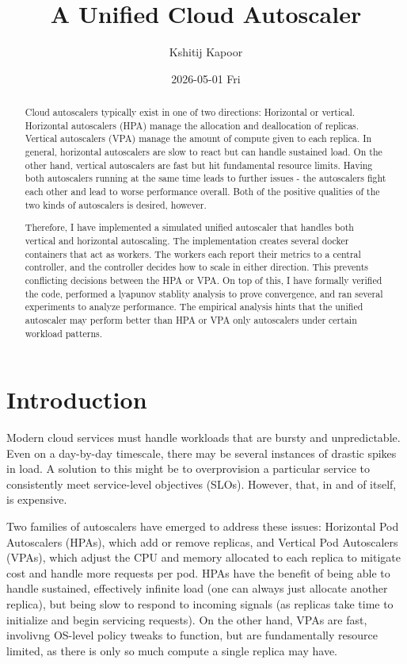\documentclass[twocolumn]{article}
\author{Kshitij Kapoor}
\date{2026-05-01 Fri}
\title{A Unified Cloud Autoscaler}
\begin{document}
\maketitle
\begin{abstract}


Cloud autoscalers typically exist in one of two directions: Horizontal or vertical. Horizontal autoscalers (HPA) manage the allocation and deallocation of replicas. Vertical autoscalers (VPA) manage the amount of compute given to each replica. In general, horizontal autoscalers are slow to react but can handle sustained load. On the other hand, vertical autoscalers are fast but hit fundamental resource limits. Having both autoscalers running at the same time leads to further issues - the autoscalers fight each other and lead to worse performance overall. Both of the positive qualities of the two kinds of autoscalers is desired, however.

Therefore, I have implemented a simulated unified autoscaler that handles both vertical and horizontal autoscaling. The implementation creates several docker containers that act as workers. The workers each report their metrics to a central controller, and the controller decides how to scale in either direction. This prevents conflicting decisions between the HPA or VPA. On top of this, I have formally verified the code, performed a lyapunov stablity analysis to prove convergence, and ran several experiments to analyze performance. The empirical analysis hints that the unified autoscaler may perform better than HPA or VPA only autoscalers under certain workload patterns.
\end{abstract}
\section{Introduction}
\label{sec:org391b5f4}

Modern cloud services must handle workloads that are bursty and unpredictable. Even on a day-by-day timescale, there may be several instances of drastic spikes in load. A solution to this might be to overprovision a particular service to consistently meet service-level objectives (SLOs). However, that, in and of itself, is expensive.

Two families of autoscalers have emerged to address these issues: Horizontal Pod Autoscalers (HPAs), which add or remove replicas, and Vertical Pod Autoscalers (VPAs), which adjust the CPU and memory allocated to each replica to mitigate cost and handle more requests per pod. HPAs have the benefit of being able to handle sustained, effectively infinite load (one can always just allocate another replica), but being slow to respond to incoming signals (as replicas take time to initialize and begin servicing requests). On the other hand, VPAs are fast, involivng OS-level policy tweaks to function, but are fundamentally resource limited, as there is only so much compute a single replica may have.
\end{document}
